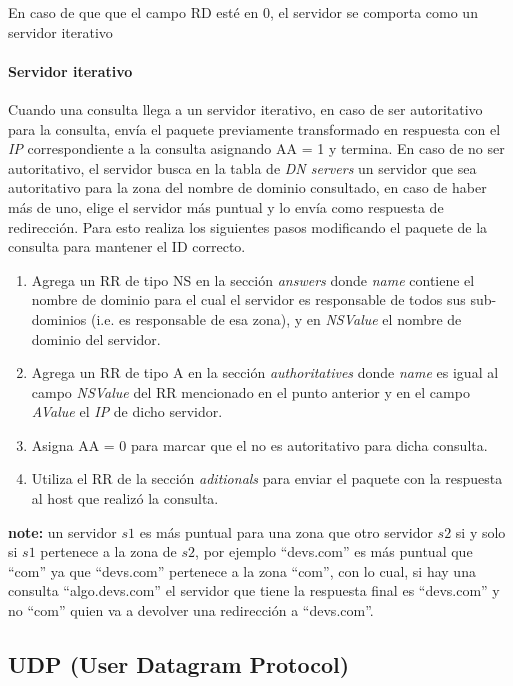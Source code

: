 \documentclass[10pt,a4paper]{article}
\begin{document}
En caso de que que el campo RD esté en 0, el servidor se comporta como un servidor iterativo \\

\paragraph{Servidor iterativo}

Cuando una consulta llega a un servidor iterativo, en caso de ser autoritativo para la consulta, envía el paquete previamente transformado en respuesta con el \textit{IP} correspondiente a la consulta asignando AA = 1 y termina. En caso de no ser autoritativo, el servidor busca en la tabla de \textit{DN servers} un servidor que sea autoritativo para la zona del nombre de dominio consultado, en caso de haber más de uno, elige el servidor más puntual y lo envía como respuesta de redirección. Para esto realiza los siguientes pasos modificando el paquete de la consulta para mantener el ID correcto.

\begin{enumerate}
\item Agrega un RR de tipo NS en la sección \textit{answers} donde \textit{name} contiene el nombre de dominio para el cual el servidor es responsable de todos sus sub-dominios (i.e. es responsable de esa zona), y en \textit{NSValue} el nombre de dominio del servidor.
\item Agrega un RR de tipo A en la sección \textit{authoritatives} donde \textit{name} es igual al campo \textit{NSValue} del RR mencionado en el punto anterior y en el campo \textit{AValue} el \textit{IP} de dicho servidor.
\item Asigna AA = 0 para marcar que el no es autoritativo para dicha consulta.
\item Utiliza el RR de la sección \textit{aditionals} para enviar el paquete con la respuesta al host que realizó la consulta.
\end{enumerate}

\textbf{note: } un servidor $s1$ es más puntual para una zona que otro servidor $s2$ si y solo si $s1$ pertenece a la zona de $s2$, por ejemplo ``devs.com'' es más puntual que ``com'' ya que ``devs.com'' pertenece a la zona ``com'', con lo cual, si hay una consulta ``algo.devs.com'' el servidor que tiene la respuesta final es ``devs.com'' y no ``com'' quien va a devolver una redirección a ``devs.com''.

\newpage

\subsection{UDP (User Datagram Protocol)}
\end{document}
